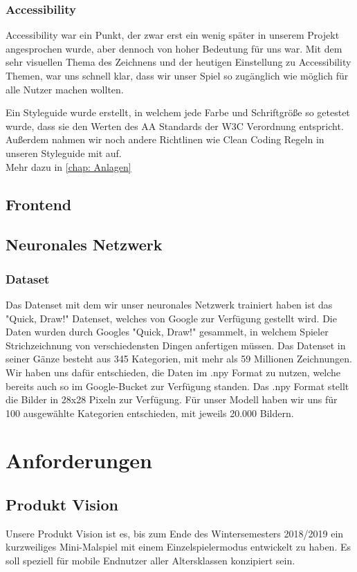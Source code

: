 \documentclass[11pt]{article}
\begin{document}
\subsubsection{Accessibility}

Accessibility war ein Punkt, der zwar erst ein wenig später in unserem Projekt angesprochen wurde, aber dennoch von hoher Bedeutung für uns war. Mit dem sehr visuellen Thema des Zeichnens und der heutigen Einstellung zu Accessibility Themen, war uns schnell klar, dass wir unser Spiel so zugänglich wie möglich für alle Nutzer machen wollten.

Ein Styleguide wurde erstellt, in welchem jede Farbe und Schriftgröße so getestet wurde, dass sie den Werten des AA Standards der W3C Verordnung entspricht. Außerdem nahmen wir noch andere Richtlinen wie Clean Coding Regeln in unseren Styleguide mit auf.\\
Mehr dazu in \autoref{chap: Anlagen} 

\subsection{Frontend}
\subsection{Neuronales Netzwerk}
\subsubsection{Dataset}
Das Datenset mit dem wir unser neuronales Netzwerk trainiert haben ist das "Quick, Draw!" \parencite{quickDraw} Datenset, welches von Google zur Verfügung gestellt wird. Die Daten wurden durch Googles "Quick, Draw!" \parencite{quickDraw} gesammelt, in welchem Spieler Strichzeichnung von verschiedensten Dingen anfertigen müssen. Das Datenset in seiner Gänze besteht aus 345 Kategorien, mit mehr als 59 Millionen Zeichnungen. 
Wir haben uns dafür entschieden, die Daten im .npy Format zu nutzen, welche bereits auch so im Google-Bucket zur Verfügung standen. Das .npy Format stellt die Bilder in 28x28 Pixeln zur Verfügung. 
Für unser Modell haben wir uns für 100 ausgewählte Kategorien entschieden, mit jeweils 20.000 Bildern.
\section{Anforderungen}
\label{chap: Anforderungen}
\subsection{Produkt Vision}
\label{chap: productVision}
Unsere Produkt Vision ist es, bis zum Ende des Wintersemesters 2018/2019 ein kurzweiliges Mini-Malspiel mit einem Einzelspielermodus entwickelt zu haben. Es soll speziell für mobile Endnutzer aller Altersklassen konzipiert sein.
\end{document}

